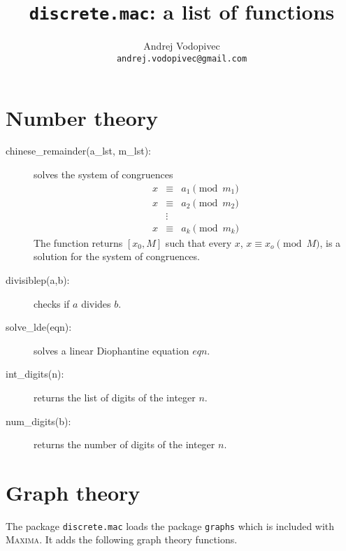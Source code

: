 \documentclass[11pt]{article}
\newcommand{\maxima}{\textsc{Maxima}}
\begin{document}
\title{\texttt{discrete.mac}: a list of functions}
\author{Andrej Vodopivec\\ \texttt{andrej.vodopivec@gmail.com}}
\date{}
\maketitle


\section{Number theory}

\begin{description}
  \item[chinese\_remainder(a\_lst, m\_lst):] solves the system of
    congruences
    \begin{eqnarray*}
      x & \equiv & a_1 \pmod{m_1} \\
      x & \equiv & a_2 \pmod{m_2} \\
        & \vdots &                 \\
      x & \equiv & a_k \pmod{m_k}
    \end{eqnarray*}
    The function returns $[x_0,M]$ such that every $x$, $x\equiv
    x_o\pmod{M}$, is a solution for the system of congruences.
  \item[divisiblep(a,b):] checks if $a$ divides $b$.
  \item[solve\_lde(eqn):] solves a linear Diophantine equation $eqn$.
  \item[int\_digits(n):] returns the list of digits of the integer
    $n$.
  \item[num\_digits(b):] returns the number of digits of the integer
    $n$.
\end{description}

\section{Graph theory}

The package \verb|discrete.mac| loads the package \verb|graphs| which
is included with \maxima. It adds the following graph theory
functions.
\end{document}
